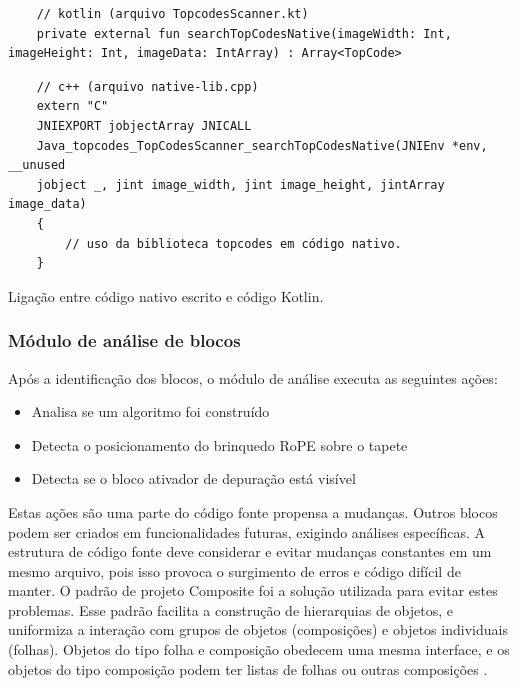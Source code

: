 \begin{quadro}[!h]
    \begin{verbatim}
    // kotlin (arquivo TopcodesScanner.kt)
    private external fun searchTopCodesNative(imageWidth: Int, imageHeight: Int, imageData: IntArray) : Array<TopCode>
    \end{verbatim}
    
    \begin{verbatim}
    // c++ (arquivo native-lib.cpp)
    extern "C" 
    JNIEXPORT jobjectArray JNICALL
    Java_topcodes_TopCodesScanner_searchTopCodesNative(JNIEnv *env, __unused 
    jobject _, jint image_width, jint image_height, jintArray image_data) 
    { 
        // uso da biblioteca topcodes em código nativo.
    }
    \end{verbatim}
    \caption{Ligação entre código nativo escrito e código Kotlin. }
    \label{quadro:jni}
\end{quadro}




\subsubsection{Módulo de análise de blocos}
Após a identificação dos blocos, o módulo de análise executa as seguintes ações:

\begin{itemize}
\item Analisa se um algoritmo foi construído
\item Detecta o posicionamento do brinquedo RoPE sobre o tapete
\item Detecta se o bloco ativador de depuração está visível
\end{itemize}

Estas ações são uma parte do código fonte propensa a mudanças. Outros blocos podem ser criados em funcionalidades futuras, exigindo análises específicas. A estrutura de código fonte deve considerar e evitar mudanças constantes em um mesmo arquivo, pois isso provoca o surgimento de erros e código difícil de manter. 
O padrão de projeto Composite foi a solução utilizada para evitar estes problemas. Esse padrão facilita a construção de hierarquias de objetos, e uniformiza a interação com grupos de objetos (composições) e objetos individuais (folhas). Objetos do tipo folha e composição obedecem uma mesma interface, e os objetos do tipo composição podem ter listas de folhas ou outras composições \cite{gamma_design_1994}.


